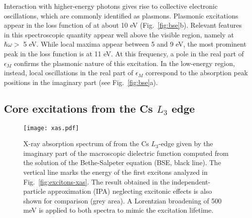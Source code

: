 \documentclass[aps,pra,superscriptaddress,twocolumn]{revtex4}
\begin{document}
Interaction with higher-energy photons gives rise to collective electronic oscillations, which are commonly identified as plasmons.
Plasmonic excitations appear in the loss function of  at about 10 eV (Fig.~\ref{fig:bse}b).
Relevant features in this spectroscopic quantity appear well above the visible region, namely at $\hbar \omega >$ 5 eV.
While local maxima appear between 5 and 9 eV, the most prominent peak in the loss function is at 11 eV.
At this frequency, a pole in the real part of $\epsilon_M$ confirms the plasmonic nature of this excitation.
In the low-energy region, instead, local oscillations in the real part of $\epsilon_M$ correspond to the absorption peak positions in the imaginary part (see Fig.~\ref{fig:bse}a). 

\subsection{Core excitations from the Cs $L_3$ edge}
%
\begin{figure}
\center
\texttt{[image: xas.pdf]}
\caption{X-ray absorption spectrum of  from the Cs $L_3$-edge given by the imaginary part of the macroscopic dielectric function computed from the solution of the Bethe-Salpeter equation (BSE, black line). The vertical line marks the energy of the first excitons analyzed in Fig.~\ref{fig:excitons-xas}. The result obtained in the independent-particle approximation (IPA) neglecting excitonic effects is also shown for comparison (grey area). A Lorentzian broadening of 500 meV is applied to both spectra to mimic the excitation lifetime.}
\label{fig:xas}
\end{figure} 
%
\end{document}
